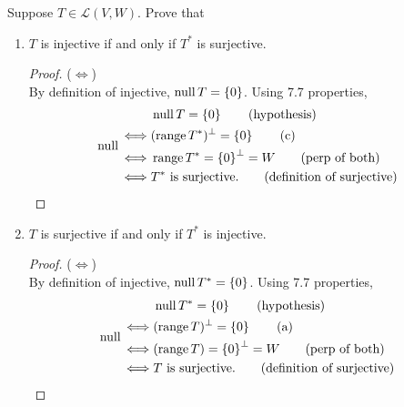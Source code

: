 Suppose $T \in \mathcal{L}(V,W)$. Prove that
    \begin{enumerate}
    \item $T$ is injective if and only if $T^*$ is surjective.
    \begin{proof} ($\Longleftrightarrow$)
        \\By definition of injective, $\operatorname{null} T = \left\{{0}\right\}$.
        Using 7.7 properties, 
        \begin{align*}
            & \null T = \set0 \tag{\text{hypothesis}}\\
            \iff & (\range T^*)^{\perp} = \set0 \tag{c}\\
            \iff & \range T^* = \set0^{\perp} = W \tag{\text{perp of both}}\\
            \iff & T^* \text{ is surjective.} \tag{\text{definition of surjective}}
        \end{align*}
    \end{proof}

    \item $T$ is surjective if and only if $T^*$ is injective.
    \begin{proof} ($\Longleftrightarrow$)
        \\By definition of injective, $\operatorname{null} T^* = \left\{{0}\right\}$.
        Using 7.7 properties, 
        \begin{align*}
            & \null T^* = \set0 \tag{\text{hypothesis}}\\
            \iff & (\range T)^{\perp} = \set0 \tag{a}\\
            \iff & (\range T) = \set0^{\perp} = W \tag{\text{perp of both}}\\
            \iff & T \text{ is surjective.} \tag{\text{definition of surjective}}
         \end{align*}
    \end{proof}
\end{enumerate}